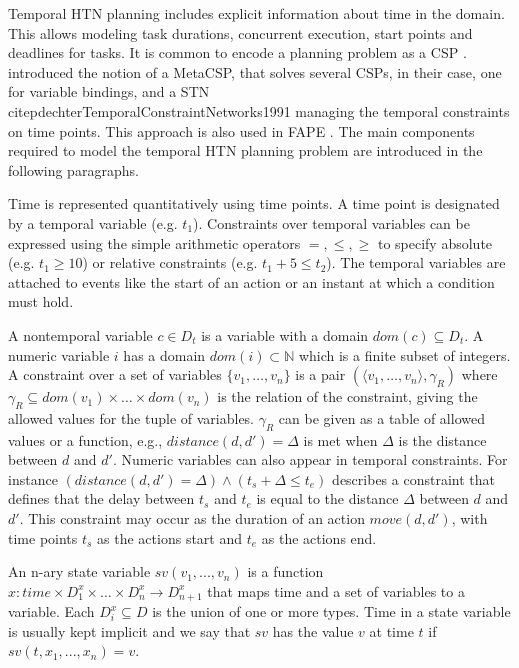 Temporal \ac{HTN} planning includes explicit information about time in the domain.
This allows modeling task durations, concurrent execution, start points and deadlines for tasks.
It is common to encode a planning problem as a \ac{CSP} \citep[chap.~8]{ghallabAutomatedPlanningTheory2004}.
\cite{stockHierarchicalHybridPlanning2015} introduced the notion of a MetaCSP, that solves several \ac{CSP}s, in their case, one for variable bindings, and a \ac{STN} \\citep{dechterTemporalConstraintNetworks1991} managing the temporal constraints on time points.
This approach is also used in \ac{FAPE} \citep{bit-monnotTemporalHierarchicalModels2016a}.
The main components required to model the temporal \ac{HTN} planning problem are introduced in the following paragraphs. 


Time is represented quantitatively using time points. %
A time point is designated by a temporal variable (e.g. $t_1$).
Constraints over temporal variables can be expressed using the simple arithmetic operators $=,\leq,\geq$ to specify absolute  (e.g. $t_1 \geq 10$) or relative constraints (e.g. $t_1 + 5 \leq t_2$).
The temporal variables are attached to events like the start of an action or an instant at which a condition must hold.

A nontemporal variable $c \in D_t$ is a variable with a domain $dom(c) \subseteq D_t$.
A numeric variable $i$ has a domain $dom(i) \subset \mathbb{N}$ which is a finite subset of integers.
A constraint over a set of variables $\{v_1,\dots,v_n \}$ is a pair $(\langle v_1, \dots, v_n \rangle, \gamma_R)$ where $\gamma_R \subseteq dom(v_1) \times \dots \times dom(v_n)$ is the relation of the constraint, giving the allowed values for the tuple of variables.
$\gamma_R$ can be given as a table of allowed values or a function, e.g., $\textit{distance}(d, d') = \Delta$ is met when $\Delta$ is the distance between $d$ and $d'$.
Numeric variables can also appear in temporal constraints.
For instance $(\textit{distance}(d, d') = \Delta) \land (t_s + \Delta \leq t_e)$ describes a constraint that defines that the delay between $t_s$ and $t_e$ is equal to the distance $\Delta$ between $d$ and $d'$.
This constraint may occur as the duration of an action $move(d,d')$, with time points $t_s$ as the actions start and $t_e$ as the actions end.

\begin{definition}
  An n-ary state variable $sv(v_1,...,v_n)$ is a function $x: time \times D_1^x \times \dots \times D_n^x \rightarrow D_{n+1}^x$ that maps time and a set of variables to a variable.
  Each $D_i^x \subseteq D$ is the union of one or more types.
  Time in a state variable is usually kept implicit and we say that $sv$ has the value $v$ at time $t$ if $sv(t,x_1,...,x_n) = v$.
\end{definition}

